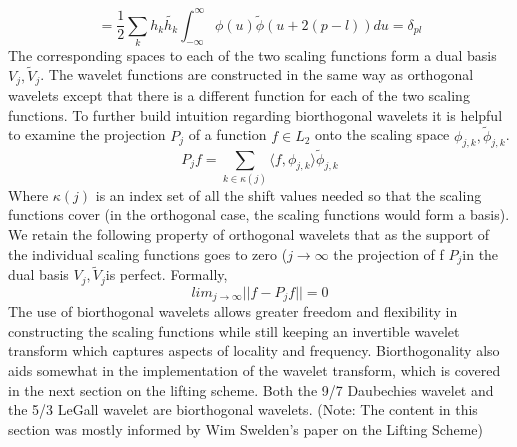 \documentclass{article}
\begin{document}
\[=\frac{1}{2}\sum_{k}h_k\tilde{h_{k}}\int_{-\infty}^{\infty}\phi(u)\tilde{\phi}(u+2(p-l))du=\delta_{pl}\]
The corresponding spaces to each of the two scaling functions form a dual basis \(V_{j},\tilde{V}_{j} \).
The wavelet functions are constructed in the same way as orthogonal wavelets except that there is a different function for each of the two scaling functions. 
To further build intuition regarding biorthogonal wavelets it is helpful to examine the projection \(P_j\) of a function \(f\in L_2\) onto the scaling space \(\phi_{j,k}, \tilde{\phi}_{j,k}\).
\[P_{j} f = \sum_{k\in\kappa(j)} \langle f,\phi_{j,k} \rangle \tilde{\phi}_{j,k}\]
Where \(\kappa(j)\) is an index set of all the shift values needed so that the scaling functions cover (in the orthogonal case, the scaling functions would form a basis). We retain the following property of orthogonal wavelets that as the support of the individual scaling functions goes to zero (\(j \to \infty\) the projection of f \(P_{j}\)in the dual basis \(V_{j}, \tilde{V}_{j}\)is perfect. Formally,
\[lim_{j\to\infty} ||f-P_{j} f||=0\]
The use of biorthogonal wavelets allows greater freedom and flexibility in constructing the scaling functions while still keeping an invertible wavelet transform which captures aspects of locality and frequency. Biorthogonality also aids somewhat in the implementation of the wavelet transform, which is covered in the next section on the lifting scheme. Both the 9/7 Daubechies wavelet and the 5/3 LeGall wavelet are biorthogonal wavelets. (Note: The content in this section was mostly informed by Wim Swelden's paper on the Lifting Scheme\cite{academicpaper1})
\end{document}
